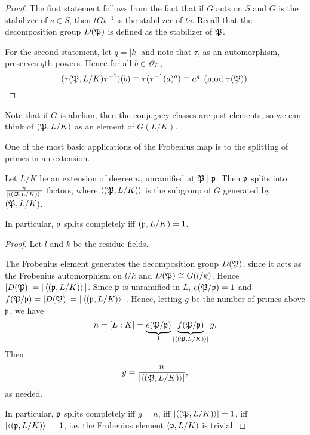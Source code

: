 \begin{proof}
The first statement follows from the fact that if $G$ acts on $S$ and $G$ is the stabilizer of $s\in S$, then $tGt^{-1}$ is the stabilizer of $ts$. Recall that the decomposition group $D(\mathfrak{P})$ is defined as the stabilizer of $\mathfrak{P}$.

For the second statement, let $q=|k|$ and note that $\tau$, as an automorphism, preserves $q$th powers. Hence for all $b\in \mathscr{O}_L$,
\[
(\tau(\mathfrak{P},L/K)\tau^{-1})(b)\equiv \tau(\tau^{-1}(a)^{q})\equiv a^{q}\pmod{\tau(\mathfrak{P})}.\qedhere
\]
\end{proof}
Note that if $G$ is abelian, then the conjugacy classes are just elements, so we can think of $(\mathfrak{P},L/K)$ as an element of $G(L/K)$.

One of the most basic applications of the Frobenius map is to the splitting of primes in an extension.
\begin{pr}
Let $L/K$ be an extension of degree $n$, unramified at $\mathfrak{P}\mid \mathfrak{p}$. Then $\mathfrak{p}$ splits into $\frac{n}{\left| {\left\langle {(\mathfrak{P},L/K)}\right\rangle} \right|}$ factors, where $\left\langle {(\mathfrak{P},L/K)}\right\rangle$ is the subgroup of $G$ generated by $(\mathfrak{P},L/K)$.

In particular, $\mathfrak{p}$ splits completely iff $(\mathfrak{p},L/K)=1$.
\end{pr}
\begin{proof}
Let $l$ and $k$ be the residue fields.

The Frobenius element generates the decomposition group $D(\mathfrak{P})$, since it acts as the Frobenius automorphism on $l/k$ and $D(\mathfrak{P})\cong G(l/k)$. Hence $|D(\mathfrak{P})|=|\left\langle {(\mathfrak{p},L/K)}\right\rangle|$. Since $\mathfrak{p}$ is unramified in $L$, $e(\mathfrak{P}/\mathfrak{p})=1$ and $f(\mathfrak{P}/\mathfrak{p})=|D(\mathfrak{P})|=|\left\langle {(\mathfrak{p},L/K)}\right\rangle|$. Hence, letting $g$ be the number of primes above $\mathfrak{p}$, we have 
\[n=[L:K]=\underbrace{e(\mathfrak{P}/\mathfrak{p})}_{1} \underbrace{f(\mathfrak{P}/\mathfrak{p})}_{|\left\langle {(\mathfrak{P},L/K)}\right\rangle|}g.\]
Then 
\[g=\frac{n}{\left| {\left\langle {(\mathfrak{P},L/K)}\right\rangle} \right|},\]
as needed.

In particular, $\mathfrak{p}$ splits completely iff $g=n$, %
iff $\left| {\left\langle {(\mathfrak{P},L/K)}\right\rangle} \right|=1$, iff $\left| {\left\langle {(\mathfrak{p},L/K)}\right\rangle} \right|=1$, i.e. the Frobenius element $(\mathfrak{p},L/K)$ is trivial.
\end{proof}
%

